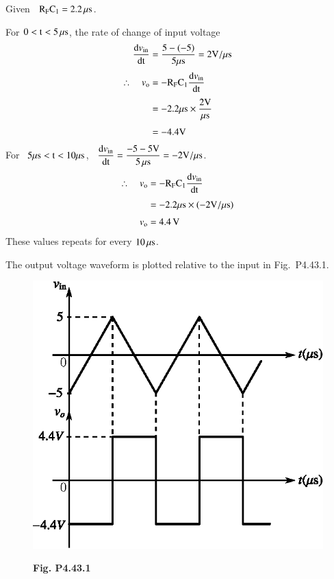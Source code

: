 \begin{solution}
Given \ $\textrm{R}_{\textrm{F}}\textrm{C}_{1}=2.2\,\mu\textrm{s}$.

\medskip
For $0<\textrm{t}<5\,\mu\textrm{s}$, the rate of change of input voltage
\begin{align*}
\dfrac{\textrm{d} v_{\text{in}}}{\operatorname{dt}} &= \frac{5-(-5)}{5\mu\textrm{s}}=2\textrm{V}/\mu\textrm{s}\\[3pt]
\therefore\quad v_{\textrm{o}} &= -\textrm{R}_{\textrm{F}}\textrm{C}_{1}\dfrac{\textrm{d} v_{\text{in}}}{\operatorname{dt}}\\[3pt]
&= -2.2\mu\textrm{s} \times \dfrac{2\textrm{V}}{\mu\textrm{s}}\\[3pt]
&= -4.4\textrm{V}
\end{align*}
For~ $5\mu\textrm{s} <\textrm{t} < 10\mu\textrm{s}$, \ $\dfrac{\textrm{d} v_{\text{in}}}{\operatorname{dt}}=\dfrac{-5-5\textrm{V}}{5\,\mu\textrm{s}}=-2\textrm{V}/\mu\textrm{s}$.
\begin{align*}
\therefore\quad v_{\textrm{o}} &= -\textrm{R}_{\textrm{F}}\textrm{C}_{1}\dfrac{\textrm{d} v_{\text{in}}}{\operatorname{dt}}\\[3pt]
&= -2.2\mu\textrm{s} \times (-2\textrm{V}/\mu\textrm{s})\\[3pt]
v_{\textrm{o}} &= 4.4\,\textrm{V}
\end{align*}
These values repeats for every $10\,\mu\textrm{s}$.

The output voltage waveform is plotted relative to the input in Fig.~P4.43.1.
\begin{figure}[H]
\centering
\includegraphics{chap4/figP4.42.1.eps}

\smallskip
{\bf Fig. P4.43.1}
\end{figure}
\end{solution}

